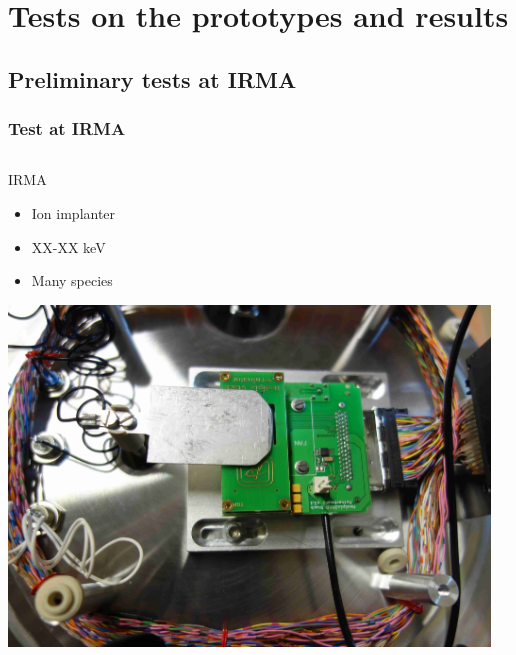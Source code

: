 \section{Tests on the prototypes and results}
\subsection{Preliminary tests at IRMA}
\begin{frame}
  \frametitle{Test at IRMA}
  \begin{columns}
    \begin{column}{0.45\textwidth}
      \begin{block}{IRMA}
        \begin{itemize}
          \item Ion implanter
          \item XX-XX keV
          \item Many species
        \end{itemize}
      \end{block}
      \includegraphics[width=\textwidth]{04_Test/fig/fig000_IRMA_setup01.jpg}
    \end{column}
    \begin{column}{0.45\textwidth}
      \begin{columns}
        \begin{column}{0.45\textwidth}

\end{column}
\end{columns}
\end{column}
\end{columns}
\end{frame}
